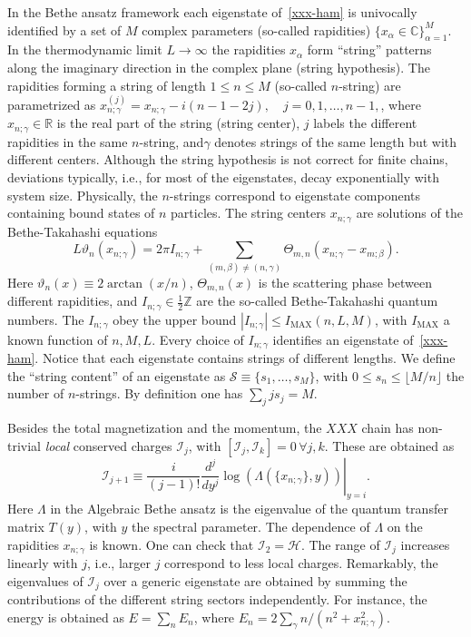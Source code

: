 \documentclass[twocolumn,superscriptaddress,prb,10pt]{revtex4-1}
\begin{document}
In the Bethe ansatz framework each eigenstate of~\eqref{xxx-ham} is univocally 
identified by a set of $M$ complex parameters (so-called rapidities) 
$\{x_\alpha\in\mathbb{C}\}_{\alpha=1}^M$. In the thermodynamic limit 
$L\to\infty$ the rapidities ${x_\alpha}$ form ``string'' patterns along 
the imaginary direction in the complex plane (string hypothesis). The 
rapidities forming a string of length $1\le n\le M$ (so-called $n$-string) 
are parametrized as $x_{n;\gamma}^{(j)}=x_{n;\gamma}-i(n-1-2j),\quad j=0,1,
\dots,n-1,$, where $x_{n;\gamma}\in\mathbb{R}$ is the real part of the 
string (string center), $j$ labels the different rapidities in the same 
$n$-string, and$\gamma$ denotes strings of the same length but with 
different centers. Although the string hypothesis is not correct for finite 
chains, deviations typically, i.e., for most of the eigenstates, decay 
exponentially with system size. Physically, the $n$-strings correspond 
to eigenstate components containing bound states of $n$ particles. 
The string centers $x_{n;\gamma}$ are solutions of the Bethe-Takahashi equations 
%
\begin{equation}
L\vartheta_n(x_{n;\gamma})=2\pi I_{n;\gamma}+\sum\limits_{(m,\beta)
\ne(n,\gamma)}\Theta_{m,n}(x_{n;\gamma}-x_{m;\beta}).
\label{bt-eq}
\end{equation}
%
Here $\vartheta_n(x)\equiv2\arctan(x/n)$, $\Theta_{m,n}(x)$ is the scattering 
phase between different rapidities, and $I_{n;\gamma}\in\frac{1}{2}
\mathbb{Z}$ are the so-called Bethe-Takahashi quantum numbers. 
The $I_{n;\gamma}$ obey the upper bound $|I_{n;\gamma}|\le I_{\textrm{MAX}}(n,L,M)$, 
with $I_{\textrm{MAX}}$ a known function of $n,M,L$. 
Every choice of $I_{n;\gamma}$ identifies an eigenstate of~\eqref{xxx-ham}. 
Notice that each eigenstate contains strings of different lengths. We define 
the ``string content'' of an eigenstate as ${\mathcal S}\equiv\{s_1,\dots,
s_M\}$, with $0\le s_n\le \lfloor M/n\rfloor$ the number of $n$-strings. By 
definition one has $\sum_{j}js_j=M$. 

Besides the total magnetization and the momentum, the $XXX$ chain has non-trivial 
{\it local} conserved charges ${\mathcal I}_j$, with $[{\mathcal I}_j,
{\mathcal I}_k]=0\,\forall j,k$. These are obtained as  
%
\begin{equation}
\label{I-def}
\left.{\mathcal I}_{j+1}\equiv\frac{i}{(j-1)!}\frac{d^j}{dy^j}\log(\Lambda
(\{x_{n;\gamma}\},y))
\right|_{y=i}.
\end{equation}
%
Here $\Lambda$ in the Algebraic Bethe ansatz is the eigenvalue of the quantum 
transfer matrix $T(y)$, with $y$ the spectral parameter. The dependence of 
$\Lambda$ on the rapidities $x_{n;\gamma}$ is known. One can check that 
${\mathcal I}_2={\mathcal H}$. The range of ${\mathcal I}_j$ increases 
linearly with $j$, i.e., larger $j$ correspond to less local charges. 
Remarkably, the eigenvalues of ${\mathcal I}_j$ over a generic eigenstate are 
obtained by summing the contributions of the different string sectors independently. 
For instance, the energy is obtained as $E=\sum_n E_n$, where $E_n=2\sum_\gamma n/
(n^2+x^2_{n;\gamma})$. 
\end{document}
